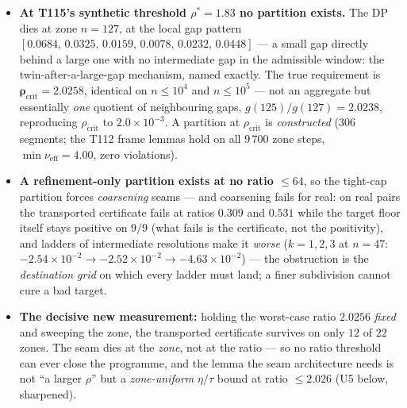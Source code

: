 \documentclass[11pt,a4paper]{article}
\begin{document}
\begin{itemize}[leftmargin=1.5em]
\item \textbf{At T115's synthetic threshold $\rho^*=1.83$ no partition exists.} The DP dies at zone
$n=127$, at the local gap pattern $[0.0684,\,0.0325,\,0.0159,\,0.0078,\,0.0232,\,0.0448]$ --- a small
gap directly behind a large one with no intermediate gap in the admissible window: the
twin-after-a-large-gap mechanism, named exactly. The true requirement is
$\boldsymbol{\rho_{\mathrm{crit}}=2.0258}$, identical on $n\le10^{4}$ and $n\le10^{5}$ --- not an
aggregate but essentially \emph{one} quotient of neighbouring gaps, $g(125)/g(127)=2.0238$,
reproducing $\rho_{\mathrm{crit}}$ to $2.0\times10^{-3}$. A partition at $\rho_{\mathrm{crit}}$ is
\emph{constructed} ($306$ segments; the T112 frame lemmas hold on all $9\,700$ zone steps, $\min
\nu_{\mathrm{eff}}=4.00$, zero violations).
\item \textbf{A refinement-only partition exists at no ratio $\le64$}, so the tight-cap partition
forces \emph{coarsening} seams --- and coarsening fails for real: on real pairs the transported
certificate fails at ratios $0.309$ and $0.531$ while the target floor itself stays positive on
$9/9$ (what fails is the certificate, not the positivity), and ladders of intermediate resolutions
make it \emph{worse} ($k=1,2,3$ at $n=47$: $-2.54\times10^{-2}\to-2.52\times10^{-2}\to
-4.63\times10^{-2}$) --- the obstruction is the \emph{destination grid} on which every ladder must
land; a finer subdivision cannot cure a bad target.
\item \textbf{The decisive new measurement:} holding the worst-case ratio $2.0256$ \emph{fixed} and
sweeping the zone, the transported certificate survives on only $12$ of $22$ zones. The seam dies at
the \emph{zone}, not at the ratio --- so no ratio threshold can ever close the programme, and the
lemma the seam architecture needs is not ``a larger $\rho$'' but a \emph{zone-uniform} $\eta/\tau$
bound at ratio $\le2.026$ (U5 below, sharpened).
\end{itemize}
\end{document}
